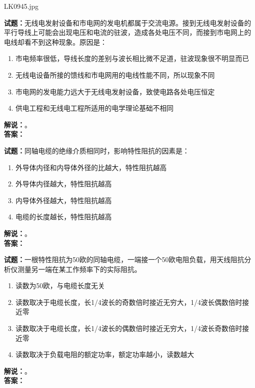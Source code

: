 \documentclass{ctexbook}
\begin{document}
\bigskip

LK0945.jpg


\noindent\textbf{试题：}无线电发射设备和市电网的发电机都属于交流电源。接到无线电发射设备的平行导线上可能会出现电压和电流的驻波，造成各处电压不同，而接到市电网上的电线却看不到这种现象。原因是：
\begin{enumerate}[leftmargin=3em]
\item 市电频率很低，导线长度的差别与波长相比微不足道，驻波现象很不明显而已
\item 无线电设备所接的馈线和市电网用的电线性能不同，所以现象不同
\item 市电网的发电能力远大于无线电发射设备，致使电路各处电压恒定
\item 供电工程和无线电工程所适用的电学理论基础不相同
\end{enumerate}
\noindent\textbf{解说：}\textbf{}。\\\noindent\textbf{答案：}

\bigskip




\noindent\textbf{试题：}同轴电缆的绝缘介质相同时，影响特性阻抗的因素是：
\begin{enumerate}[leftmargin=3em]
\item 外导体内径和内导体外径的比越大，特性阻抗越高
\item 外导体内径越大，特性阻抗越高
\item 内导体外径越大，特性阻抗越高
\item 电缆的长度越长，特性阻抗越高
\end{enumerate}
\noindent\textbf{解说：}\textbf{}。\\\noindent\textbf{答案：}

\bigskip




\noindent\textbf{试题：}一根特性阻抗为50欧的同轴电缆，一端接一个50欧电阻负载，用天线阻抗分析仪测量另一端在某工作频率下的实际阻抗。
\begin{enumerate}[leftmargin=3em]
\item 读数为50欧，与电缆长度无关
\item 读数取决于电缆长度，长1/4波长的奇数倍时接近无穷大，1/4波长偶数倍时接近零
\item 读数取决于电缆长度，长1/4波长的偶数倍时接近无穷大，1/4波长奇数倍时接近零
\item 读数取决于负载电阻的额定功率，额定功率越小，读数越大
\end{enumerate}
\noindent\textbf{解说：}\textbf{}。\\\noindent\textbf{答案：}
\end{document}
